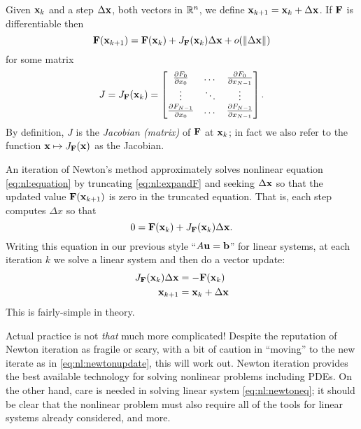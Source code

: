 Given $\mathbf{x}_k$ and a step $\Delta\mathbf{x}$, both vectors in $\mathbb{R}^n$, we define $\mathbf{x}_{k+1} = \mathbf{x}_k + \Delta\mathbf{x}$.  If $\mathbf{F}$ is differentiable then
\begin{equation}
    \mathbf{F}(\mathbf{x}_{k+1}) = \mathbf{F}(\mathbf{x}_k) + J_{\mathbf{F}}(\mathbf{x}_k) \Delta\mathbf{x} + o(\|\Delta\mathbf{x}\|)  \label{eq:nl:expandF}
\end{equation}
for some matrix
\begin{equation}
J = J_{\mathbf{F}}(\mathbf{x}_k) = \begin{bmatrix}
    \frac{\partial F_0}{\partial x_0} & \dots & \frac{\partial F_0}{\partial x_{N-1}} \\
    \vdots & \ddots & \vdots \\
    \frac{\partial F_{N-1}}{\partial x_0} & \dots & \frac{\partial F_{N-1}}{\partial x_{N-1}}  \end{bmatrix}.  \label{eq:nl:jacdefn}
\end{equation}
By definition, $J$ is the \emph{Jacobian (matrix)} of $\mathbf{F}$ at $\mathbf{x}_k$; in fact we also refer to the function $\mathbf{x} \mapsto J_{\mathbf{F}}(\mathbf{x})$ as the Jacobian.

An iteration of Newton's method approximately solves nonlinear equation \eqref{eq:nl:equation} by truncating \eqref{eq:nl:expandF} and seeking $\Delta \mathbf{x}$ so that the updated value $\mathbf{F}(\mathbf{x}_{k+1})$ is zero in the truncated equation.  That is,  each step computes $\Delta x$ so that
\begin{equation}
    0 = \mathbf{F}(\mathbf{x}_k) + J_{\mathbf{F}}(\mathbf{x}_k) \Delta\mathbf{x}.
\end{equation}
Writing this equation in our previous style ``$A\mathbf{u}=\mathbf{b}$'' for linear systems, at each iteration $k$ we solve a linear system and then do a vector update:
\begin{align}
    J_{\mathbf{F}}(\mathbf{x}_k) \Delta\mathbf{x} &= - \mathbf{F}(\mathbf{x}_k)  \label{eq:nl:newtoneq}  \\
    \mathbf{x}_{k+1} &= \mathbf{x}_k + \Delta\mathbf{x}  \label{eq:nl:newtonupdate}
\end{align}
This is fairly-simple in theory.

Actual practice is not \emph{that} much more complicated!  Despite the reputation of Newton iteration as fragile or scary, with a bit of caution in ``moving'' to the new iterate as in \eqref{eq:nl:newtonupdate}, this will work out.  Newton iteration provides the best available technology for solving nonlinear problems including PDEs.  On the other hand, care is needed in solving linear system \eqref{eq:nl:newtoneq}; it should be clear that the nonlinear problem must also require all of the tools for linear systems already considered, and more.

